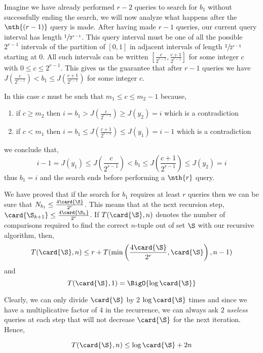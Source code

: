 Imagine we have already performed $r-2$ queries to search for $b_1$ without
successfully ending the search, we will now analyze what happens after the
$\nth{(r-1)}$ query is made. After having made $r-1$ queries, our current query
interval has length $\sfrac{1}{2^{r-1}}$. This query interval must be one of
all the possible $2^{r-1}$ intervals of the partition of $[0,1]$ in adjacent
intervals of length $\sfrac{1}{2^{r-1}}$ starting at $0$. All such intervals
can be written $[\frac{c}{2^{r-1}}, \frac{c+1}{2^{r-1}}]$ for some integer $c$
with $0 \le c \le 2^{r-1}$. This gives us the guarantee that after $r-1$
queries we have $J(\frac{c}{2^{r-1}}) < b_1 \le J(\frac{c+1}{2^{r-1}})$ for
some integer $c$.

In this case $c$ must be such that $m_1 \le c \le m_2 - 1$ because,
\begin{enumerate}
\item if $c \ge m_2$ then $i = b_1 > J(\frac{c}{2^{r-1}}) \ge J(y_2) = i$
which is a contradiction
\item if $c < m_1$ then $i = b_1 \le J(\frac{c+1}{2^{r-1}}) \le J(y_1) = i - 1$
which is a contradiction
\end{enumerate}
we conclude that,
$$i-1 = J(y_1) \le J\left(\frac{c}{2^{r-1}}\right) < b_1 \le
J\left(\frac{c+1}{2^{r-1}}\right) \le J(y_2) = i$$
thus $b_1 = i$ and the search ends before performing a $\nth{r}$ query.

We have proved that if the search for $b_1$ requires at least $r$ queries then
we can be sure that $N_{b_1} \le \frac{4\card{\S}}{2^r}$. This means that at
the next recursion step, $\card{\S_{k+1}} \le \frac{4\card{\S_k}}{2^r}$. If
$T(\card{\S}, n)$ denotes the number of comparisons required to find the
correct $n$-tuple out of set $\S$ with our recursive algorithm, then,
$$T(\card{\S}, n) \le r + T(\min\left(\frac{4\card{\S}}{2^r}, \card{\S}\right), n-1)$$
and
$$T(\card{\S}, 1) = \BigO{\log \card{\S}}$$

Clearly, we can only divide $\card{\S}$ by $2$ $\log \card{\S}$ times and since
we have a multiplicative factor of $4$ in the recurrence, we can always ask $2$
\emph{useless} queries at each step that will not decrease $\card{\S}$ for the
next iteration. Hence,

$$T(\card{\S}, n) \le \log \card{\S} + 2n$$
